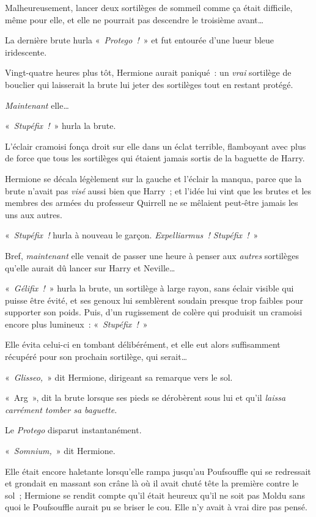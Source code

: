 Malheureusement, lancer deux sortilèges de sommeil comme ça était difficile, même pour elle, et elle ne pourrait pas descendre le troisième avant…

La dernière brute hurla «~\emph{Protego~!}~» et fut entourée d'une lueur bleue iridescente.

Vingt-quatre heures plus tôt, Hermione aurait paniqué~: un \emph{vrai} sortilège de bouclier qui laisserait la brute lui jeter des sortilèges tout en restant protégé.

\emph{Maintenant} elle…

«~\emph{Stupéfix~!}~» hurla la brute.

L'éclair cramoisi fonça droit sur elle dans un éclat terrible, flamboyant avec plus de force que tous les sortilèges qui étaient jamais sortis de la baguette de Harry.

Hermione se décala légèlement sur la gauche et l'éclair la manqua, parce que la brute n’avait pas \emph{visé} aussi bien que Harry~; et l'idée lui vint que les brutes et les membres des armées du professeur Quirrell ne se mêlaient peut-être jamais les uns aux autres.

«~\emph{Stupéfix~!} hurla à nouveau le garçon.
\emph{Expelliarmus~!
Stupéfix~!}~»

Bref, \emph{maintenant} elle venait de passer une heure à penser aux \emph{autres} sortilèges qu'elle aurait dû lancer sur Harry et Neville…

«~\emph{Gélifix~!}~» hurla la brute, un sortilège à large rayon, sans éclair visible qui puisse être évité, et ses genoux lui semblèrent soudain presque trop faibles pour supporter son poids.
Puis, d'un rugissement de colère qui produisit un cramoisi encore plus lumineux~: «~\emph{Stupéfix~!}~»

Elle évita celui-ci en tombant délibérément, et elle eut alors suffisamment récupéré pour son prochain sortilège, qui serait…

«~\emph{Glisseo,}~» dit Hermione, dirigeant sa remarque vers le sol.

«~Arg~», dit la brute lorsque ses pieds se dérobèrent sous lui et qu'il \emph{laissa carrément tomber sa baguette.}

Le \emph{Protego} disparut instantanément.

«~\emph{Somnium,}~» dit Hermione.

Elle était encore haletante lorsqu'elle rampa jusqu'au Poufsouffle qui se redressait et grondait en massant son crâne là où il avait chuté tête la première contre le sol~; Hermione se rendit compte qu'il était heureux qu'il ne soit pas Moldu sans quoi le Poufsouffle aurait pu se briser le cou.
Elle n'y avait à vrai dire pas pensé.


